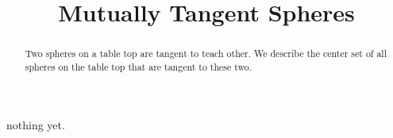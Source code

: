\documentclass{ximera}
\title{Mutually Tangent Spheres}
\begin{document}
\begin{abstract}
Two spheres on a table top are tangent to teach other. We describe the center set of all spheres on the table top that are tangent to these two. 
\end{abstract}
\maketitle

nothing yet.
\end{document}
